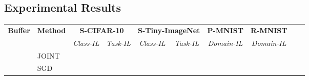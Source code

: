 \documentclass{article}
\newcommand{\xmark}{\textbf{\textendash}}
\begin{document}
\subsection{Experimental Results}
\label{subsec:cl_exps}
\begin{table*}[t]
\centering
{
\setlength{\tabcolsep}{2.0pt}
\small
\begin{tabular}{clcccccccc}
\toprule
 \multirow{2}{*}{\textbf{Buffer}} & \multirow{2}{*}{\textbf{Method}} & \multicolumn{2}{c}{\textbf{S-CIFAR-10}} & \multicolumn{2}{c}{\textbf{S-Tiny-ImageNet}} & \textbf{P-MNIST} & \textbf{R-MNIST}\\
\addlinespace[0.35ex]
 & & \textit{Class-IL} & \textit{Task-IL} & \textit{Class-IL} & \textit{Task-IL} & \textit{Domain-IL} & \textit{Domain-IL}\\
\midrule
\multirow{2}{*}{\xmark} & JOINT          & \tiny{} & \tiny{} & \tiny{} & \tiny{} & \tiny{} & \tiny{} \\
& SGD             & \tiny{} & \tiny{} & \tiny{} & \tiny{} & \tiny{} & \tiny{} \\
     \midrule
     


\end{tabular}}
\end{table*}
\end{document}
